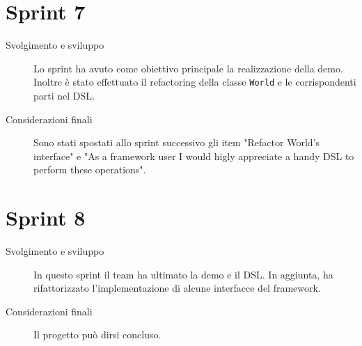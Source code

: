 \section{Sprint 7}\label{sec:sprint-7}
\begin{description}
    \item[Svolgimento e sviluppo] Lo sprint ha avuto come obiettivo principale la realizzazione della demo.
    Inoltre è stato effettuato il refactoring della classe \texttt{World} e le corrispondenti parti nel DSL\@.
    \item[Considerazioni finali] Sono stati spostati allo sprint successivo gli item "Refactor World's interface" e "As a framework user I would higly appreciate a handy DSL to perform these operations".
\end{description}
\section{Sprint 8}\label{sec:sprint-8}
\begin{description}
    \item[Svolgimento e sviluppo] In questo sprint il team ha ultimato la demo e il DSL. In aggiunta, ha rifattorizzato l'implementazione di alcune interfacce del framework.
    \item[Considerazioni finali] Il progetto può dirsi concluso.
\end{description}